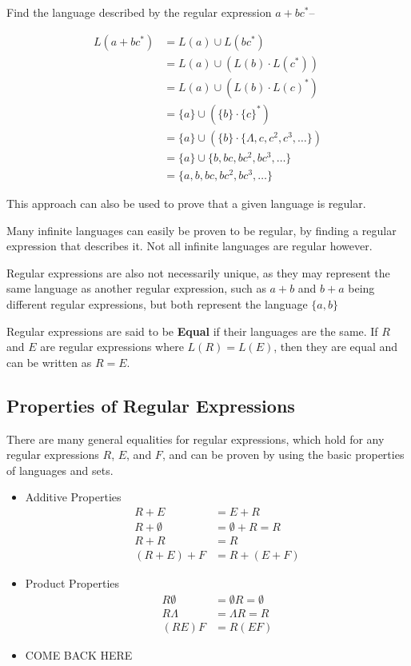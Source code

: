 \begin{example*}{}{}
  Find the language described by the regular expression $a + bc^*$--

  \begin{align*}
    L(a + bc^*) &= L(a) \cup L(bc^*)\\
    &= L(a) \cup (L(b) \cdot L(c^*))\\
    &= L(a) \cup (L(b) \cdot {L(c)}^*)\\
    &= \{a\} \cup (\{b\} \cdot {\{c\}}^*)\\
    &= \{a\} \cup (\{b\} \cdot \{\Lambda, c, c^2, c^3, \ldots\})\\
    &= \{a\} \cup \{b, bc, bc^2, bc^3, \ldots\}\\
    &= \{a, b, bc, bc^2, bc^3, \ldots\}
  \end{align*}
\end{example*}

This approach can also be used to prove that a given language is regular.

Many infinite languages can easily be proven to be regular, by finding a regular expression that describes it. Not all
 infinite languages are regular however.

Regular expressions are also not necessarily unique, as they may represent the same language as another regular expression,
 such as $a+b$ and $b+a$ being different regular expressions, but both represent the language $\{a, b\}$

\begin{definition*}{}{}
  Regular expressions are said to be \textbf{Equal} if their languages are the same. If $R$ and $E$ are regular expressions
   where $L(R) = L(E)$, then they are equal and can be written as $R = E$.
\end{definition*}

\subsection*{Properties of Regular Expressions}

There are many general equalities for regular expressions, which hold for any regular expressions $R$, $E$, and $F$, and
 can be proven by using the basic properties of languages and sets.

\begin{itemize}
  \item Additive Properties
  \begin{align*}
    R + E &= E + R\\
    R + \emptyset &= \emptyset + R = R\\
    R + R &= R\\
    (R + E) + F &= R + (E + F)
  \end{align*}
  \item Product Properties
  \begin{align*}
    R \emptyset &= \emptyset R = \emptyset\\
    R \Lambda &= \Lambda R = R\\
    (RE)F &= R(EF)
  \end{align*}
  \item COME BACK HERE
\end{itemize}

